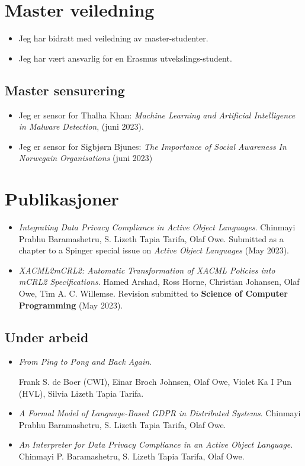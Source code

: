 \documentclass[11pt]{article}
\begin{document}
\section{Master veiledning}
\label{sec-2}
\begin{itemize}
\item Jeg har bidratt med veiledning av  master-studenter.
\item Jeg har vært ansvarlig for en Erasmus utvekslings-student.
\end{itemize}
\subsection{Master sensurering}
\label{sec-2-1}
\begin{itemize}
\item Jeg er sensor for Thalha Khan:
\emph{Machine Learning and Artificial Intelligence in Malware Detection},
(juni 2023).
\item Jeg er sensor for Sigbjørn Bjunes:
\emph{The Importance of Social Awareness In Norwegain Organisations} (juni 2023)
\end{itemize}
\section{Publikasjoner}
\label{sec-3}
\begin{itemize}
\item \emph{Integrating Data Privacy Compliance in Active Object Languages}.
Chinmayi Prabhu Baramashetru, S. Lizeth Tapia Tarifa, Olaf Owe.
Submitted as a chapter to a Spinger special issue on \emph{Active Object
Languages}  (May 2023).

\item \emph{XACML2mCRL2: Automatic Transformation of XACML Policies into mCRL2 Specifications}.
Hamed Arshad, Ross Horne, Christian Johansen, Olaf Owe, Tim
A. C. Willemse.   
Revision submitted to \textbf{Science of Computer  Programming} (May 2023).
\end{itemize}


\subsection{Under arbeid}
\label{sec-3-1}

\begin{itemize}
\item \emph{From Ping to Pong and Back Again}.

Frank S. de Boer (CWI), Einar Broch Johnsen, Olaf Owe,
Violet Ka I Pun  (HVL),  Silvia Lizeth Tapia Tarifa.

\item \emph{A Formal Model of Language-Based GDPR in Distributed Systems}. 
Chinmayi Prabhu Baramashetru, S. Lizeth Tapia Tarifa,
Olaf Owe.

\item \emph{An Interpreter for  Data Privacy Compliance in an Active Object
Language}. 
Chinmayi P. Baramashetru, S. Lizeth Tapia Tarifa,
Olaf Owe.
\end{itemize}
\end{document}
